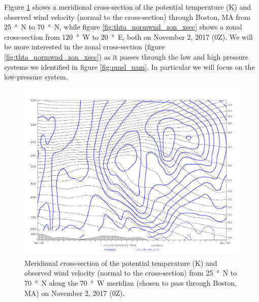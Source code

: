 \documentclass[11pt]{article}
\begin{document}
Figure \ref{fig:thta_normwnd_mer_xsec} shows a meridional cross-section of the potential temperature (K) and observed wind velocity (normal to the cross-section) through Boston, MA from \SI{25}{\degree N} to \SI{70}{\degree N}, while figure \ref{fig:thta_normwnd_zon_xsec} shows a zonal cross-section from \SI{120}{\degree W} to \SI{20}{\degree E}, both on November 2, 2017 (0Z). We will be more interested in the zonal cross-section (figure \ref{fig:thta_normwnd_zon_xsec}) as it passes through the low and high pressure systems we identified in figure \ref{fig:pmsl_nam}. In particular we will focus on the low-pressure system.

\begin{figure}[h!]
  \centering
  \includegraphics[width=\textwidth]{thta_normwnd_70W_25-70N}
  \caption{Meridional cross-section of the potential temperature (K) and observed wind velocity (normal to the cross-section) from \SI{25}{\degree N} to \SI{70}{\degree N} along the \SI{70}{\degree W} meridian (chosen to pass through Boston, MA) on November 2, 2017 (0Z).}
  \label{fig:thta_normwnd_mer_xsec}
\end{figure}
\end{document}
